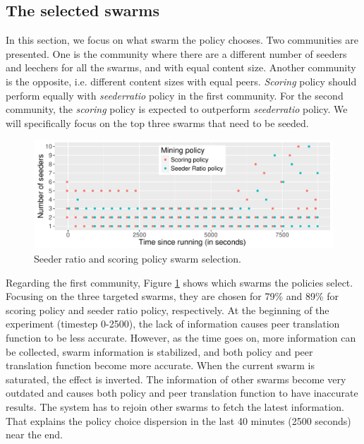 \subsection{The selected swarms}
In this section, we focus on what swarm the policy chooses. Two communities are presented. One is the community where there are a different number of seeders and leechers for all the swarms, and with equal content size. Another community is the opposite, i.e. different content sizes with equal peers. \textit{Scoring} policy should perform equally with \textit{seederratio} policy in the first community. For the second community, the \textit{scoring} policy is expected to outperform \textit{seederratio} policy. We will specifically focus on the top three swarms that need to be seeded.

\label{section:chooseswarmexp}
\begin{figure}[h]
	\centering
	\includegraphics[width=\textwidth]{pics/results/scsr_notrig_scatter.pdf}
	\caption{Seeder ratio and scoring policy swarm selection.}
	\label{fig:scatterscsrnotrig}
\end{figure}

Regarding the first community, Figure \ref{fig:scatterscsrnotrig} shows which swarms the policies select. Focusing on the three targeted swarms, they are chosen for 79\% and 89\% for scoring policy and seeder ratio policy, respectively. At the beginning of the experiment (timestep 0-2500), the lack of information causes peer translation function to be less accurate. However, as the time goes on, more information can be collected, swarm information is stabilized, and both policy and peer translation function become more accurate. When the current swarm is saturated, the effect is inverted. The information of other swarms become very outdated and causes both policy and peer translation function to have inaccurate results. The system has to rejoin other swarms to fetch the latest information. That explains the policy choice dispersion in the last 40 minutes (2500 seconds) near the end. 

